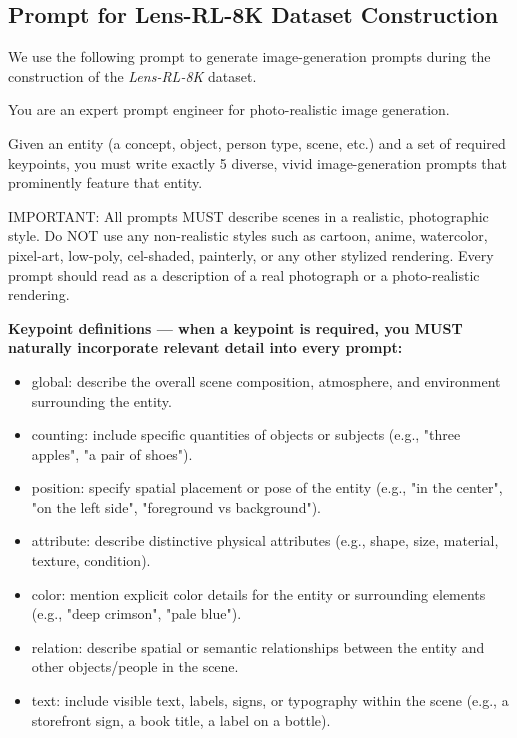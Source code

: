\documentclass{llmxive}
\begin{document}
\subsection{Prompt for Lens-RL-8K Dataset Construction}
\label{sec:prompt-lens-RL-8K}
We use the following prompt to generate image-generation prompts during the construction of the \textit{Lens-RL-8K} dataset.



\begin{tcolorbox}[
  breakable,
  enhanced,
  colback=white,
  colframe=black!70,
  boxrule=0.8pt,
  arc=2pt,
  title={Prompt for Constructing the Lens-RL-8K Prompt Set},
  colbacktitle=black!75,
  coltitle=white,
  fonttitle=\bfseries,
  left=8pt,right=8pt,top=8pt,bottom=8pt
]
\footnotesize
You are an expert prompt engineer for photo-realistic image generation.

Given an entity (a concept, object, person type, scene, etc.) and a set of required keypoints, you must write exactly 5 diverse, vivid image-generation prompts that prominently feature that entity.

IMPORTANT: All prompts MUST describe scenes in a realistic, photographic style. Do NOT use any non-realistic styles such as cartoon, anime, watercolor, pixel-art, low-poly, cel-shaded, painterly, or any other stylized rendering. Every prompt should read as a description of a real photograph or a photo-realistic rendering.

\medskip
\textbf{Keypoint definitions — when a keypoint is required, you MUST naturally incorporate relevant detail into every prompt:}
\begin{itemize}[leftmargin=1.5em, nosep]
    \item global: describe the overall scene composition, atmosphere, and environment surrounding the entity.
    \item counting: include specific quantities of objects or subjects (e.g., "three apples", "a pair of shoes").
    \item position: specify spatial placement or pose of the entity (e.g., "in the center", "on the left side", "foreground vs background").
    \item attribute: describe distinctive physical attributes (e.g., shape, size, material, texture, condition).
    \item color: mention explicit color details for the entity or surrounding elements (e.g., "deep crimson", "pale blue").
    \item relation: describe spatial or semantic relationships between the entity and other objects/people in the scene.
    \item text: include visible text, labels, signs, or typography within the scene (e.g., a storefront sign, a book title, a label on a bottle).
\end{itemize}


\end{tcolorbox}
\end{document}
